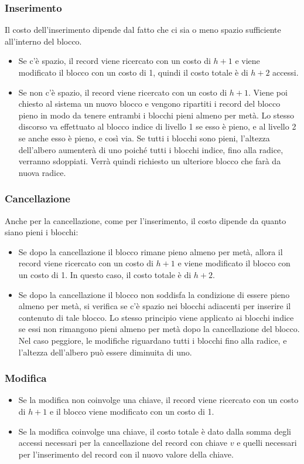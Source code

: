 \documentclass{article}
\begin{document}
\subsubsection{Inserimento}
Il costo dell'inserimento dipende dal fatto che ci sia o meno spazio sufficiente all'interno del blocco.

\begin{itemize}
    \item Se c'è spazio, il record viene ricercato con un costo di $h+1$ e viene modificato il blocco con un costo di 1, quindi il costo totale è di $h+2$ accessi.
    \item Se non c'è spazio, il record viene ricercato con un costo di $h+1$. Viene poi chiesto al sistema un nuovo blocco e vengono ripartiti i record del blocco pieno in modo da tenere entrambi i blocchi pieni almeno per metà. Lo stesso discorso va effettuato al blocco indice di livello 1 se esso è pieno, e al livello 2 se anche esso è pieno, e così via. Se tutti i blocchi sono pieni, l'altezza dell'albero aumenterà di uno poiché tutti i blocchi indice, fino alla radice, verranno sdoppiati. Verrà quindi richiesto un ulteriore blocco che farà da nuova radice.
\end{itemize}

\subsubsection{Cancellazione}
Anche per la cancellazione, come per l'inserimento, il costo dipende da quanto siano pieni i blocchi:

\begin{itemize}
    \item Se dopo la cancellazione il blocco rimane pieno almeno per metà, allora il record viene ricercato con un costo di $h+1$ e viene modificato il blocco con un costo di 1. In questo caso, il costo totale è di $h+2$.
    \item Se dopo la cancellazione il blocco non soddisfa la condizione di essere pieno almeno per metà, si verifica se c'è spazio nei blocchi adiacenti per inserire il contenuto di tale blocco. Lo stesso principio viene applicato ai blocchi indice se essi non rimangono pieni almeno per metà dopo la cancellazione del blocco. Nel caso peggiore, le modifiche riguardano tutti i blocchi fino alla radice, e l'altezza dell'albero può essere diminuita di uno.
\end{itemize}

\subsubsection{Modifica}
\begin{itemize}
  \item Se la modifica non coinvolge una chiave, il record viene ricercato con un costo di $h+1$ e il blocco viene modificato con un costo di 1.
  \item Se la modifica coinvolge una chiave, il costo totale è dato dalla somma degli accessi necessari per la cancellazione del record con chiave $v$ e quelli necessari per l'inserimento del record con il nuovo valore della chiave.
\end{itemize}
\end{document}
